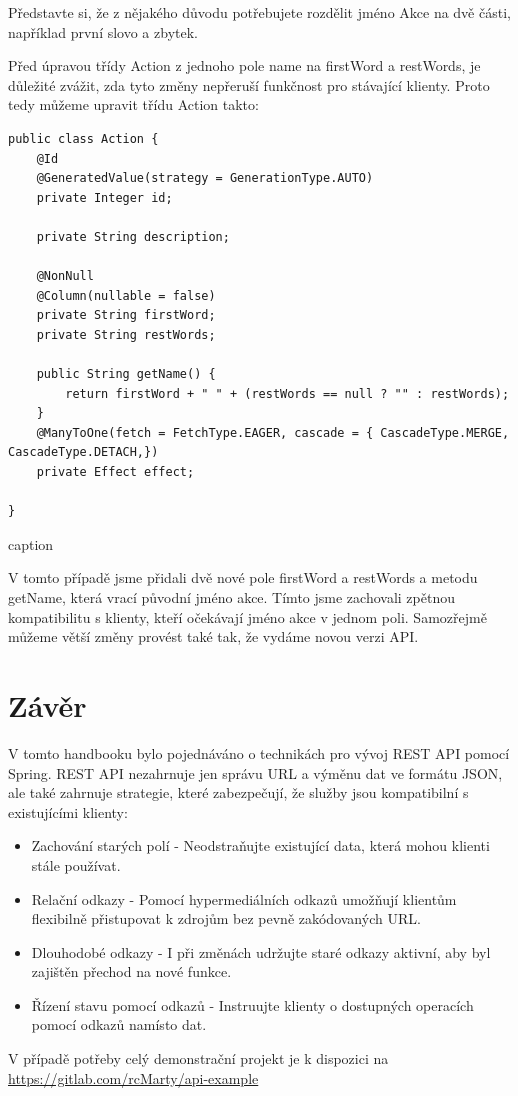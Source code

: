 Představte si, že z nějakého důvodu potřebujete rozdělit jméno Akce na dvě části, například první slovo a zbytek.

Před úpravou třídy Action z jednoho pole name na firstWord a restWords, je důležité zvážit, zda tyto změny nepřeruší funkčnost pro stávající klienty. Proto tedy můžeme upravit třídu Action takto:

\begin{listing}[H]
    \begin{verbatim}
public class Action {
    @Id
    @GeneratedValue(strategy = GenerationType.AUTO)
    private Integer id;

    private String description;

    @NonNull
    @Column(nullable = false)
    private String firstWord;
    private String restWords;

    public String getName() {
        return firstWord + " " + (restWords == null ? "" : restWords);
    }
    @ManyToOne(fetch = FetchType.EAGER, cascade = { CascadeType.MERGE, CascadeType.DETACH,})
    private Effect effect;

}
    \end{verbatim}
    \caption{caption}
    \label{code:label}
\end{listing}

V tomto případě jsme přidali dvě nové pole firstWord a restWords a metodu getName, která vrací původní jméno akce. Tímto jsme zachovali zpětnou kompatibilitu s klienty, kteří očekávají jméno akce v jednom poli. Samozřejmě můžeme větší změny provést také tak, že vydáme novou verzi API.

\section*{Závěr}

V tomto handbooku bylo pojednáváno o technikách pro vývoj REST API pomocí Spring. REST API nezahrnuje jen správu URL a výměnu dat ve formátu JSON, ale také zahrnuje strategie, které zabezpečují, že služby jsou kompatibilní s existujícími klienty:

\begin{itemize}
    \item Zachování starých polí - Neodstraňujte existující data, která mohou klienti stále používat.
    \item Relační odkazy - Pomocí hypermediálních odkazů umožňují klientům flexibilně přistupovat k zdrojům bez pevně zakódovaných URL.
    \item Dlouhodobé odkazy - I při změnách udržujte staré odkazy aktivní, aby byl zajištěn přechod na nové funkce.
    \item Řízení stavu pomocí odkazů - Instruujte klienty o dostupných operacích pomocí odkazů namísto dat.
\end{itemize}

V případě potřeby celý demonstrační projekt je k dispozici na \url{https://gitlab.com/rcMarty/api-example}